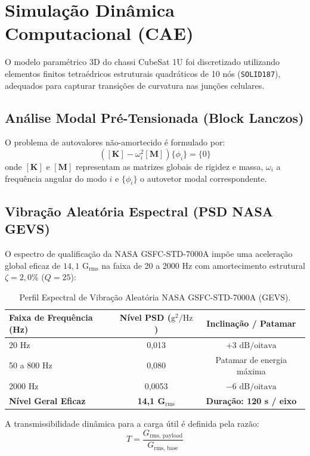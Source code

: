 \documentclass[12pt,a4paper]{report}
\begin{document}
\section{Simulação Dinâmica Computacional (CAE)}
O modelo paramétrico 3D do chassi CubeSat 1U foi discretizado utilizando elementos finitos tetraédricos estruturais quadráticos de 10 nós (\texttt{SOLID187}), adequados para capturar transições de curvatura nas junções celulares.

\subsection{Análise Modal Pré-Tensionada (Block Lanczos)}
O problema de autovalores não-amortecido é formulado por:
\begin{equation}
([\mathbf{K}] - \omega_i^2 [\mathbf{M}]) \{\phi_i\} = \{0\}
\end{equation}
onde $[\mathbf{K}]$ e $[\mathbf{M}]$ representam as matrizes globais de rigidez e massa, $\omega_i$ a frequência angular do modo $i$ e $\{\phi_i\}$ o autovetor modal correspondente.

\subsection{Vibração Aleatória Espectral (PSD NASA GEVS)}
O espectro de qualificação da NASA GSFC-STD-7000A impõe uma aceleração global eficaz de $14{,}1\text{ G}_{\text{rms}}$ na faixa de 20 a 2000 Hz com amortecimento estrutural $\zeta = 2{,}0\%$ ($Q = 25$):
\begin{table}[H]
\centering
\small
\caption{Perfil Espectral de Vibração Aleatória NASA GSFC-STD-7000A (GEVS).}
\label{tab:gevs_psd}
\begin{tabular}{lcc}
\toprule
\textbf{Faixa de Frequência (Hz)} & \textbf{Nível PSD ($\text{g}^2/\text{Hz}$)} & \textbf{Inclinação / Patamar} \\
\midrule
20 Hz & 0,013 & $+3\text{ dB/oitava}$ \\
50 a 800 Hz & 0,080 & Patamar de energia máxima \\
2000 Hz & 0,0053 & $-6\text{ dB/oitava}$ \\
\midrule
\textbf{Nível Geral Eficaz} & \textbf{14,1 G$_{\text{rms}}$} & \textbf{Duração: 120 s / eixo} \\
\bottomrule
\end{tabular}
\end{table}

A transmissibilidade dinâmica para a carga útil é definida pela razão:
\begin{equation}
T = \frac{G_{\text{rms, payload}}}{G_{\text{rms, base}}}
\end{equation}
\end{document}
